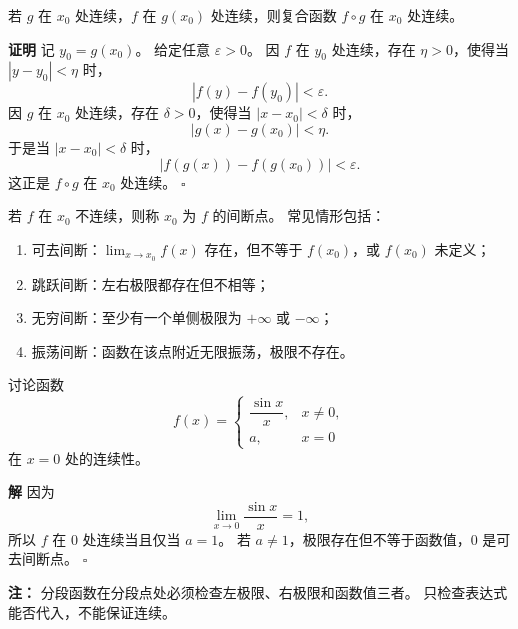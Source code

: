 \documentclass[fontset=fandol]{ctexart}
\newenvironment{proofdetail}{\par\noindent\textbf{证明}\quad}{\hfill$\square$\par\vspace{0.8em}}
\newenvironment{solution}{\par\noindent\textbf{解}\quad}{\hfill$\square$\par\vspace{0.8em}}
\newenvironment{warning}{\par\noindent\textbf{注：}\quad}{\par\vspace{0.8em}}
\begin{document}
\begin{proposition}[复合函数连续性]
若 $g$ 在 $x_0$ 处连续，$f$ 在 $g(x_0)$ 处连续，则复合函数 $f\circ g$ 在 $x_0$ 处连续。
\end{proposition}
\begin{proofdetail}
记 $y_0=g(x_0)$。 给定任意 $\varepsilon>0$。 因 $f$ 在 $y_0$ 处连续，存在 $\eta>0$，使得当 $|y-y_0|<\eta$ 时，
\[
|f(y)-f(y_0)|<\varepsilon.
\]
因 $g$ 在 $x_0$ 处连续，存在 $\delta>0$，使得当 $|x-x_0|<\delta$ 时，
\[
|g(x)-g(x_0)|<\eta.
\]
于是当 $|x-x_0|<\delta$ 时，
\[
|f(g(x))-f(g(x_0))|<\varepsilon.
\]
这正是 $f\circ g$ 在 $x_0$ 处连续。
\end{proofdetail}



\begin{definition}[间断点]
若 $f$ 在 $x_0$ 不连续，则称 $x_0$ 为 $f$ 的间断点。 常见情形包括：
\begin{enumerate}[label=(\arabic*),leftmargin=2em]
\item 可去间断：$\lim_{x\to x_0}f(x)$ 存在，但不等于 $f(x_0)$，或 $f(x_0)$ 未定义；
\item 跳跃间断：左右极限都存在但不相等；
\item 无穷间断：至少有一个单侧极限为 \(+\infty\) 或 \(-\infty\)；
\item 振荡间断：函数在该点附近无限振荡，极限不存在。
\end{enumerate}
\end{definition}

\begin{example}
讨论函数
\[
f(x)=
\begin{cases}
\dfrac{\sin x}{x},&x\neq0,\\
a,&x=0
\end{cases}
\]
在 $x=0$ 处的连续性。
\end{example}
\begin{solution}
因为
\[
\lim_{x\to0}\frac{\sin x}{x}=1,
\]
所以 $f$ 在 $0$ 处连续当且仅当 $a=1$。 若 $a\neq1$，极限存在但不等于函数值，$0$ 是可去间断点。
\end{solution}
\begin{warning}
分段函数在分段点处必须检查左极限、右极限和函数值三者。 只检查表达式能否代入，不能保证连续。
\end{warning}

\end{document}
